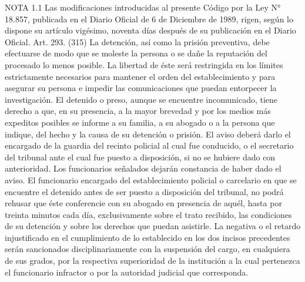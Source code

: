 NOTA 1.1
      Las modificaciones introducidas al presente Código por la Ley N° 18.857, publicada en el Diario Oficial de 6 de Diciembre de 1989, rigen, según lo dispone su artículo vigésimo, noventa días después de su publicación en el Diario Oficial.
    Art. 293. (315) La detención, así como la prisión preventiva, debe efectuarse de modo que se moleste la persona o se dañe la reputación del procesado lo menos posible. La libertad de éste será restringida en los límites estrictamente necesarios para mantener el orden del establecimiento y para asegurar su persona e impedir las comunicaciones que puedan entorpecer la investigación.
    El detenido o preso, aunque se encuentre incomunicado, tiene derecho a que, en su presencia, a la mayor brevedad y por los medios más expeditos posibles se informe a su familia, a su abogado o a la persona que indique, del hecho y la causa de su detención o prisión. El aviso deberá darlo el encargado de la guardia del recinto policial al cual fue conducido, o el secretario del tribunal ante el cual fue puesto a disposición, si no se hubiere dado con anterioridad. Los funcionarios señalados dejarán constancia de haber dado el aviso.
    El funcionario encargado del establecimiento policial o carcelario en que se encuentre el detenido antes de ser puesto a disposición del tribunal, no podrá rehusar que éste conferencie con su abogado en presencia de aquél, hasta por treinta minutos cada día, exclusivamente sobre el trato recibido, las condiciones de su detención y sobre los derechos que puedan asistirle.
    La negativa o el retardo injustificado en el cumplimiento de lo establecido en los dos incisos precedentes serán sancionados disciplinariamente con la suspensión del cargo, en cualquiera de sus grados, por la respectiva superioridad de la institución a la cual pertenezca el funcionario infractor o por la autoridad judicial que corresponda.

